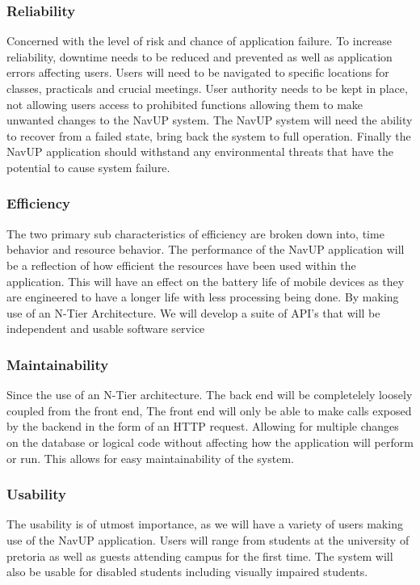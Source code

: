 \documentclass{article}
\begin{document}
		\subsubsection{Reliability}
		Concerned with the level of risk and chance of application failure. To increase reliability, downtime needs to be reduced and prevented as well as application errors affecting users. Users will need to be navigated to specific locations for classes, practicals and crucial meetings. User authority needs to be kept in place, not allowing users access to prohibited functions allowing them to make unwanted changes to the NavUP system. The NavUP system will need the ability to recover from a failed state, bring back the system to full operation. Finally the NavUP application should withstand any environmental threats that have the potential to cause system failure.
		 
		\subsubsection{Efficiency}
		The two primary sub characteristics of efficiency are broken down into, time behavior and resource behavior. The performance of the NavUP application will be a reflection of how efficient the resources have been used within the application. This will have an effect on the battery life of mobile devices as they are engineered to have a longer life with less processing being done.
		By making use of an N-Tier Architecture. We will develop a suite of API's that will be independent and usable software service
		
		\subsubsection{Maintainability}
		Since the use of an N-Tier architecture. The back end will be completelely loosely coupled from the front end, The front end will only be able to make calls exposed by the backend in the form of an HTTP request. Allowing for multiple changes on the database or logical code without affecting how the application will perform or run. This allows for easy maintainability of the system.
		
		\subsubsection{Usability}
		The usability is of utmost importance, as we will have a variety of users making use of the NavUP application. Users will range from students at the university of pretoria as well as guests attending campus for the first time. The system will also be usable for disabled students including visually impaired students.
\end{document}
